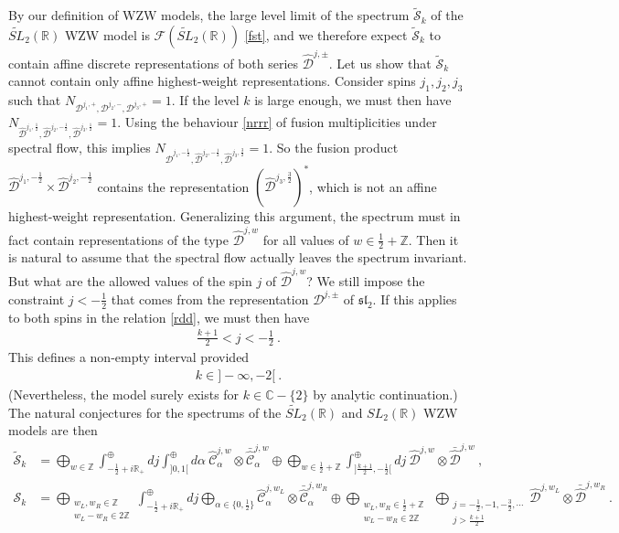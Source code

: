 \documentclass[12pt, a4paper, notitlepage, twoside]{report}
\numberwithin{equation}{section}
\theoremstyle{break}
\begin{document}
By our definition of WZW models, the large level limit of the spectrum $\tilde{\mathcal{S}}_k$ of the $\widetilde{SL}_2(\mathbb{R})$ WZW model is $\mathcal{F}(\widetilde{SL}_2(\mathbb{R}))$ \eqref{fst}, and we therefore expect $\tilde{\mathcal{S}}_k$ to contain affine discrete representations of both series $\hat{\mathcal{D}}^{j,\pm}$.
Let us show that $\tilde{\mathcal{S}}_k$ cannot contain only affine highest-weight representations.
Consider spins $j_1,j_2,j_3$ such that $N_{\mathcal{D}^{j_1,+},\mathcal{D}^{j_2,-},\mathcal{D}^{j_3,+}}=1$.
If the level $k$ is large enough, we must then have $N_{\hat{\mathcal{D}}^{j_1,\frac12},\hat{\mathcal{D}}^{j_2,-\frac12},\hat{\mathcal{D}}^{j_3,\frac12}}=1$.
Using the behaviour \eqref{nrrr} of fusion multiplicities under spectral flow, this implies $N_{\hat{\mathcal{D}}^{j_1,-\frac12},\hat{\mathcal{D}}^{j_2,-\frac12},\hat{\mathcal{D}}^{j_3,\frac32}}=1$.
So the fusion product $\hat{\mathcal{D}}^{j_1,-\frac12}\times \hat{\mathcal{D}}^{j_2,-\frac12}$ contains the representation $(\hat{\mathcal{D}}^{j_3,\frac32})^*$, which is not an affine highest-weight representation.
Generalizing this argument, the spectrum must in fact contain 
representations of the type $\hat{\mathcal{D}}^{j,w}$ for all values of $w\in \frac12+{\mathbb{Z}}$.
Then it is natural to assume that the spectral flow actually leaves the spectrum invariant.
But what are the allowed values of the spin $j$ of $\hat{\mathcal{D}}^{j,w}$? We still impose the constraint $j<-\frac12$ that comes from the representation $\mathcal{D}^{j,\pm}$ of $\mathfrak{sl}_2$.
If this applies to both spins in the relation \eqref{rdd}, we must then have 
\begin{align}
 \frac{k+1}{2} <j < -\frac12\ .
\label{jimm}
\end{align}
This defines a non-empty interval provided
\begin{align}
 \boxed{k\in]-\infty,-2[}\ .
\end{align}
(Nevertheless, the model surely exists for $k\in \mathbb{C}-\{2\}$ by analytic continuation.)
The natural conjectures for the spectrums of the $\widetilde{SL}_2(\mathbb{R})$ and $SL_2(\mathbb{R})$ WZW models are then
\begin{align}
 \tilde{\mathcal{S}}_k &= \bigoplus_{w\in{\mathbb{Z}}}\int^\oplus_{-\frac12+i{\mathbb{R}}_+} dj \int^\oplus_{]0,1[} d\alpha\ \hat{\mathcal{C}}^{j,w}_\alpha \otimes \bar{\hat{\mathcal{C}}}^{j,w}_{\alpha} 
\oplus \bigoplus_{w\in\frac12+{\mathbb{Z}}}\int^\oplus_{]\frac{k+1}{2},-\frac12[} dj\ \hat{\mathcal{D}}^{j,w}\otimes \bar{\hat{\mathcal{D}}}^{j,w} \ ,
\\
 \mathcal{S}_k &= \bigoplus_{\substack{w_L,w_R\in{\mathbb{Z}}\\ w_L-w_R\in 2{\mathbb{Z}}}}\int^\oplus_{-\frac12+i{\mathbb{R}}_+} dj \bigoplus_{\alpha\in\{0,\frac12\}} \hat{\mathcal{C}}^{j,w_L}_\alpha \otimes \bar{\hat{\mathcal{C}}}^{j,w_R}_{\alpha} \oplus  \bigoplus_{\substack{w_L,w_R\in\frac12+{\mathbb{Z}}\\ w_L-w_R\in 2{\mathbb{Z}}}}\ \bigoplus_{\substack{j= -\frac12, -1,-\frac32,\cdots \\ j>\frac{k+1}{2}}} \hat{\mathcal{D}}^{j,w_L}\otimes \bar{\hat{\mathcal{D}}}^{j,w_R} \ .
\end{align}
\end{document}
